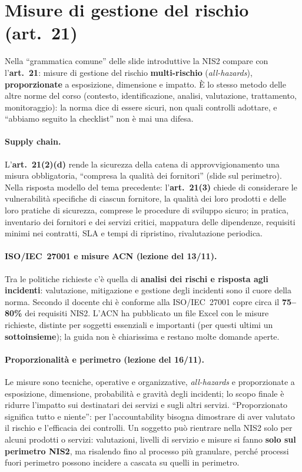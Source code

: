 \section{Misure di gestione del rischio (art.~21)}
\label{sec:nis2-misure}

Nella ``grammatica comune'' delle slide introduttive la NIS2 compare con l'\textbf{art.~21}: misure di
gestione del rischio \textbf{multi-rischio} (\emph{all-hazards}), \textbf{proporzionate} a esposizione,
dimensione e impatto. È lo stesso metodo delle altre norme del corso (contesto, identificazione,
analisi, valutazione, trattamento, monitoraggio): la norma dice di essere sicuri, non quali controlli
adottare, e ``abbiamo seguito la checklist'' non è mai una difesa.

\paragraph{Supply chain.} L'\textbf{art.~21(2)(d)} rende la sicurezza della catena di
approvvigionamento una misura obbligatoria, ``compresa la qualità dei fornitori'' (slide sul
perimetro). Nella risposta modello del tema precedente: l'\textbf{art.~21(3)} chiede di considerare le
vulnerabilità specifiche di ciascun fornitore, la qualità dei loro prodotti e delle loro pratiche di
sicurezza, comprese le procedure di sviluppo sicuro; in pratica, inventario dei fornitori e dei
servizi critici, mappatura delle dipendenze, requisiti minimi nei contratti, SLA e tempi di
ripristino, rivalutazione periodica.

\paragraph{ISO/IEC~27001 e misure ACN (lezione del 13/11).} Tra le politiche richieste c'è quella di
\textbf{analisi dei rischi e risposta agli incidenti}: valutazione, mitigazione e gestione degli
incidenti sono il cuore della norma. Secondo il docente chi è conforme alla ISO/IEC~27001 copre circa il
\textbf{75--80\%} dei requisiti NIS2. L'ACN ha pubblicato un file Excel con le misure richieste, distinte
per soggetti essenziali e importanti (per questi ultimi un \textbf{sottoinsieme}); la guida non è
chiarissima e restano molte domande aperte.

\paragraph{Proporzionalità e perimetro (lezione del 16/11).} Le misure sono tecniche, operative e
organizzative, \emph{all-hazards} e proporzionate a esposizione, dimensione, probabilità e gravità degli
incidenti; lo scopo finale è ridurre l'impatto sui destinatari dei servizi e sugli altri servizi.
``Proporzionato significa tutto e niente'': per l'accountability bisogna dimostrare di aver valutato il
rischio e l'efficacia dei controlli. Un soggetto può rientrare nella NIS2 solo per alcuni prodotti o
servizi: valutazioni, livelli di servizio e misure si fanno \textbf{solo sul perimetro NIS2}, ma
risalendo fino al processo più granulare, perché processi fuori perimetro possono incidere a cascata su
quelli in perimetro.

